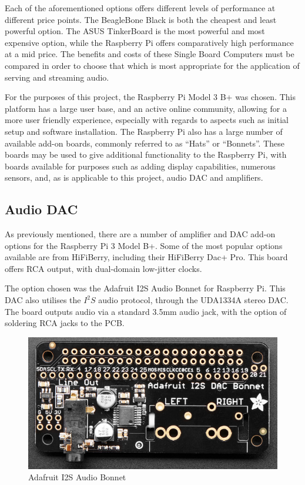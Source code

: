 \documentclass[11pt,a4paper]{scrreprt}
\begin{document}
Each of the aforementioned options offers different levels of
performance at different price points. The BeagleBone Black is both the
cheapest and least powerful option. The ASUS TinkerBoard is the most
powerful and most expensive option, while the Raspberry Pi offers
comparatively high performance at a mid price. The benefits and costs of
these Single Board Computers must be compared in order to choose that
which is most appropriate for the application of serving and streaming
audio.

For the purposes of this project, the Raspberry Pi Model 3 B+ was
chosen. This platform has a large user base, and an active online
community, allowing for a more user friendly experience, especially with
regards to aspects such as initial setup and software installation. The
Raspberry Pi also has a large number of available add-on boards,
commonly referred to as ``Hats'' or ``Bonnets''. These boards may be
used to give additional functionality to the Raspberry Pi, with boards
available for purposes such as adding display capabilities, numerous
sensors, and, as is applicable to this project, audio DAC and
amplifiers.

\subsection{Audio DAC}\label{audio-dac}

As previously mentioned, there are a number of amplifier and DAC add-on
options for the Raspberry Pi 3 Model B+. Some of the most popular
options available are from HiFiBerry, including their HiFiBerry Dac+
Pro. This board offers RCA output, with dual-domain low-jitter
clocks\cite{HiFiBerry}.

The option chosen was the Adafruit I2S Audio Bonnet for Raspberry Pi.
This DAC also utilises the \(I^2S\) audio protocol, through the UDA1334A
stereo DAC. The board outputs audio via a standard 3.5mm audio jack,
with the option of soldering RCA jacks to the PCB.

\begin{figure}[H]
\includegraphics{BackgroundLitSurvey/adafruitdac.png}
\centering
\caption{Adafruit I2S Audio Bonnet \cite{adafruit}}
\label{AdaFig}
\end{figure}
\end{document}
